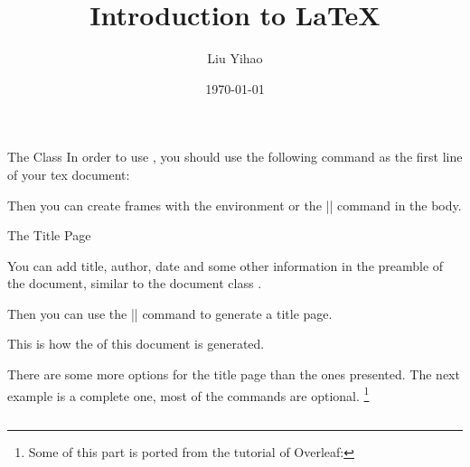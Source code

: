 \begin{fragileframe}{The  Class}
In order to use , you should use the following command as the first line of your tex document:


Then you can create frames with the  environment or the \LC|\frame| command in the  body.

\begin{example}
\end{example}


\end{fragileframe}

\begin{fragileframe}{The Title Page}

You can add title, author, date and some other information in the preamble of the document, similar to the document class .

\begin{example}
\begin{LCL}
\title{Introduction to \LaTeX}
\author{Liu Yihao}
\date{\today}
\end{LCL}
\end{example}

Then you can use the \LC|\titlepage| command to generate a title page.
\begin{command}
\begin{LCL}
\begin{frame}
  \titlepage
\end{frame}
\end{LCL}
\end{command}

This is how the \hyperlink{title-page}{} of this document is generated.

\end{fragileframe}

\begin{fragileframe}

There are some more options for the title page than the ones presented. The next example is a complete one, most of the commands are optional. \footnote[1]{Some of this part is ported from the tutorial of Overleaf: }

\begin{example}
\inputminted[lastline=18]{latex}{../examples/c5/example.tex}
\end{example}

\end{fragileframe}


